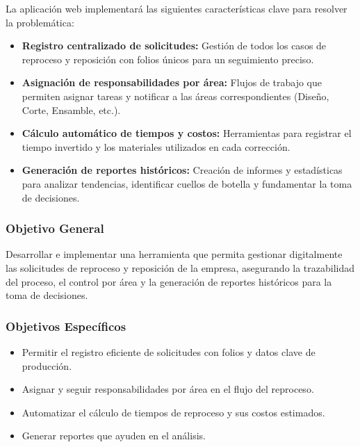 \documentclass[12pt,letterpaper,spanish]{report}
\begin{document}
La aplicación web implementará las siguientes características clave para resolver la problemática:
\begin{itemize}
    \item \textbf{Registro centralizado de solicitudes:} Gestión de todos los casos de reproceso y reposición con folios únicos para un seguimiento preciso.
    \item \textbf{Asignación de responsabilidades por área:} Flujos de trabajo que permiten asignar tareas y notificar a las áreas correspondientes (Diseño, Corte, Ensamble, etc.).
    \item \textbf{Cálculo automático de tiempos y costos:} Herramientas para registrar el tiempo invertido y los materiales utilizados en cada corrección.
    \item \textbf{Generación de reportes históricos:} Creación de informes y estadísticas para analizar tendencias, identificar cuellos de botella y fundamentar la toma de decisiones.
\end{itemize}

\subsubsection{Objetivo General}
\label{sec:objetivo_general}

Desarrollar e implementar una herramienta que permita gestionar digitalmente las solicitudes de reproceso y reposición de la empresa, asegurando la trazabilidad del proceso, el control por área y la generación de reportes históricos para la toma de decisiones.

\subsubsection{Objetivos Específicos}
\label{sec:objetivos_especificos}

\begin{itemize}
    \item Permitir el registro eficiente de solicitudes con folios y datos clave de producción.
    \item Asignar y seguir responsabilidades por área en el flujo del reproceso.
    \item Automatizar el cálculo de tiempos de reproceso y sus costos estimados.
    \item Generar reportes que ayuden en el análisis.
\end{itemize}


\end{document}
